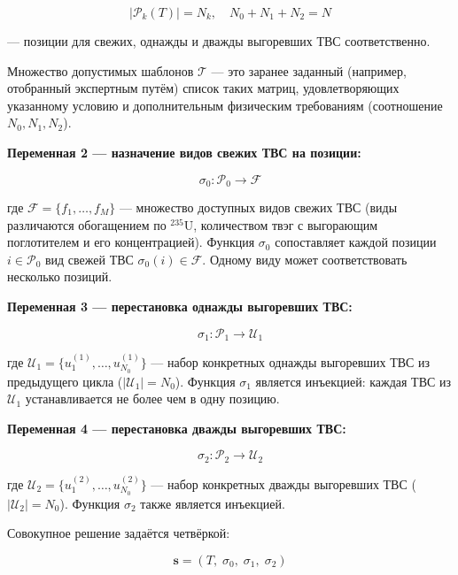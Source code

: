\documentclass[12pt,a4paper]{article}
\begin{document}
\begin{equation}
|\mathcal{P}_k(T)| = N_k, \quad N_0 + N_1 + N_2 = N
\end{equation}

--- позиции для свежих, однажды и дважды выгоревших ТВС соответственно.

Множество допустимых шаблонов $\mathcal{T}$ --- это заранее заданный (например, отобранный экспертным путём) список таких матриц, удовлетворяющих указанному условию и дополнительным физическим требованиям (соотношение $N_0, N_1, N_2$).

\textbf{Переменная 2 --- назначение видов свежих ТВС на позиции:}

\begin{equation}
\sigma_0 : \mathcal{P}_0 \to \mathcal{F}
\end{equation}

где $\mathcal{F} = \{f_1, \ldots, f_M\}$ --- множество доступных видов свежих ТВС (виды различаются обогащением по $^{235}\text{U}$, количеством твэг с выгорающим поглотителем и его концентрацией). Функция $\sigma_0$ сопоставляет каждой позиции $i \in \mathcal{P}_0$ вид свежей ТВС $\sigma_0(i) \in \mathcal{F}$. Одному виду может соответствовать несколько позиций.

\textbf{Переменная 3 --- перестановка однажды выгоревших ТВС:}

\begin{equation}
\sigma_1 : \mathcal{P}_1 \to \mathcal{U}_1
\end{equation}

где $\mathcal{U}_1 = \{u_1^{(1)}, \ldots, u_{N_0}^{(1)}\}$ --- набор конкретных однажды выгоревших ТВС из предыдущего цикла ($|\mathcal{U}_1| = N_0$). Функция $\sigma_1$ является инъекцией: каждая ТВС из $\mathcal{U}_1$ устанавливается не более чем в одну позицию.

\textbf{Переменная 4 --- перестановка дважды выгоревших ТВС:}

\begin{equation}
\sigma_2 : \mathcal{P}_2 \to \mathcal{U}_2
\end{equation}

где $\mathcal{U}_2 = \{u_1^{(2)}, \ldots, u_{N_0}^{(2)}\}$ --- набор конкретных дважды выгоревших ТВС ($|\mathcal{U}_2| = N_0$). Функция $\sigma_2$ также является инъекцией.

Совокупное решение задаётся четвёркой:

\begin{equation}
\mathbf{s} = (T,\; \sigma_0,\; \sigma_1,\; \sigma_2)
\end{equation}
\end{document}
